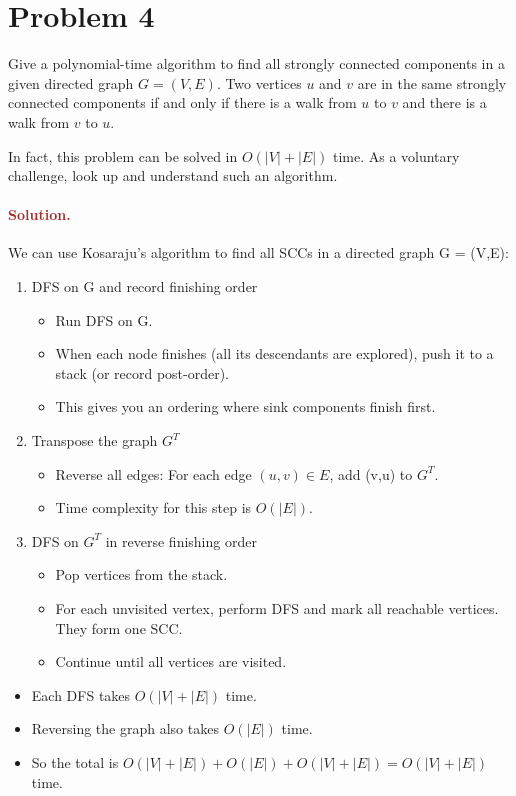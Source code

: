 \section*{Problem 4}
Give a polynomial-time algorithm to find all strongly connected components in a given directed graph $G = (V, E)$. Two vertices $u$ and $v$ are in the same strongly connected components if and only if there is a walk from $u$ to $v$ and there is a walk from $v$ to $u$.

In fact, this problem can be solved in $O(|V| + |E|)$ time. As a voluntary challenge, look up and understand such an algorithm.

\paragraph{\textcolor{brown}{Solution.}}
We can use Kosaraju's algorithm to find all SCCs in a directed graph G = (V,E): 
\begin{enumerate} \item DFS on G and record finishing order \begin{itemize} \item Run DFS on G. \item When each node finishes (all its descendants are explored), push it to a stack (or record post-order). \item This gives you an ordering where sink components finish first. \end{itemize} \item Transpose the graph $G^{T}$ \begin{itemize} \item Reverse all edges: For each edge $(u,v) \in E$, add (v,u) to $G^{T}$. \item Time complexity for this step is $O(|E|)$. \end{itemize} \item DFS on $G^{T}$ in reverse finishing order \begin{itemize} \item Pop vertices from the stack. \item For each unvisited vertex, perform DFS and mark all reachable vertices. They form one SCC. \item Continue until all vertices are visited. \end{itemize} \end{enumerate}
\begin{itemize} \item Each DFS takes $O(|V|+|E|)$ time. \item Reversing the graph also takes $O(|E|)$ time. \item So the total is $O(|V|+|E|) + O(|E|) + O(|V|+|E|) = O(|V|+|E|)$ time. \end{itemize}



